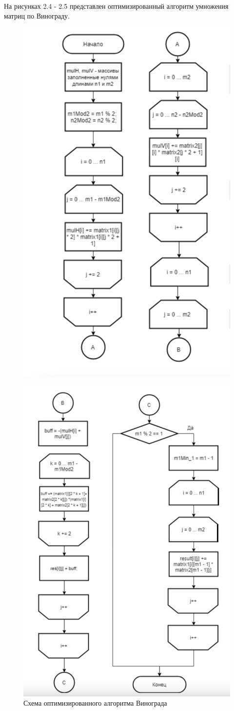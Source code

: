 \documentclass[12pt]{report}
\begin{document}
На рисунках 2.4 - 2.5 представлен оптимизированный алгоритм умножения матриц по Винограду.
\begin{figure}[H]
    \centering
    \includegraphics[width=0.70\linewidth]{4.jpg}
    \caption{ }
    \label{fig:mpr}
\end{figure}

\begin{figure}[H]
    \centering
    \includegraphics[width=0.70\linewidth]{5.jpg}
    \caption{Схема оптимизированного алгоритма Винограда}
    \label{fig:mpr}
\end{figure}
\newline
\end{document}
